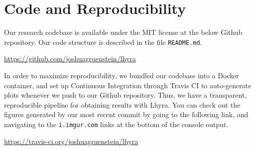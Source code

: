 \documentclass{article}
\begin{document}



\appendix
\section{Code and Reproducibility}

Our research codebase is available under the MIT license at the below Github repository.  Our code structure is described in the file \texttt{README.md}.

\begin{center}
\url{https://github.com/joshuagruenstein/lhyra}
\end{center}

In order to maximize reproducibility, we bundled our codebase into a Docker container, and set up Continuous Integration through Travis CI to auto-generate plots whenever we push to our Github repository.  Thus, we have a transparent, reproducible pipeline for obtaining results with Lhyra.  You can check out the figures generated by our most recent commit by going to the following link, and navigating to the \texttt{i.imgur.com} links at the bottom of the console output.

\begin{center}
\url{https://travis-ci.org/joshuagruenstein/lhyra}
\end{center}
\end{document}
